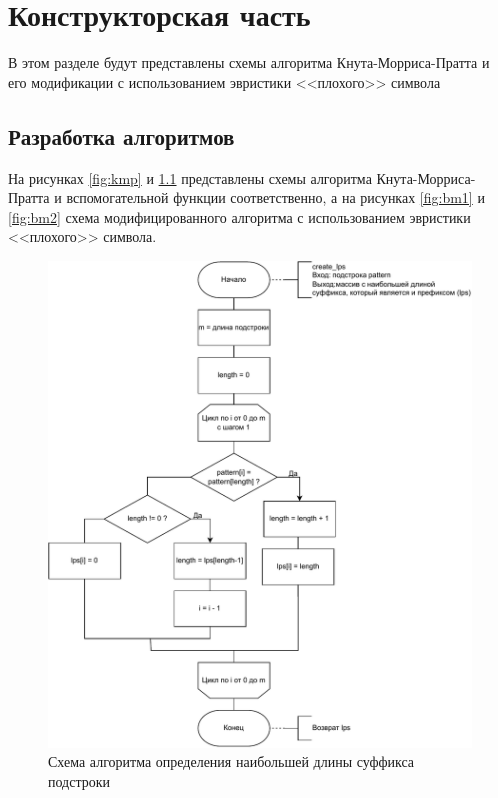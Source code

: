 \chapter{Конструкторская часть}
В этом разделе будут представлены схемы алгоритма Кнута-Морриса-Пратта и его модификации с использованием эвристики <<плохого>> символа


\section{Разработка алгоритмов}
На рисунках \ref{fig:kmp} и \ref{fig:lps} представлены схемы алгоритма Кнута-Морриса-Пратта и вспомогательной функции соответственно, а на рисунках \ref{fig:bm1} и \ref{fig:bm2} схема модифицированного алгоритма с использованием эвристики <<плохого>> символа.

\begin{figure}[h!]
	\centering
	\includegraphics[width=0.78\linewidth]{img/lps}
	\caption{Схема алгоритма определения наибольшей длины суффикса подстроки}
	\label{fig:lps}
\end{figure}


